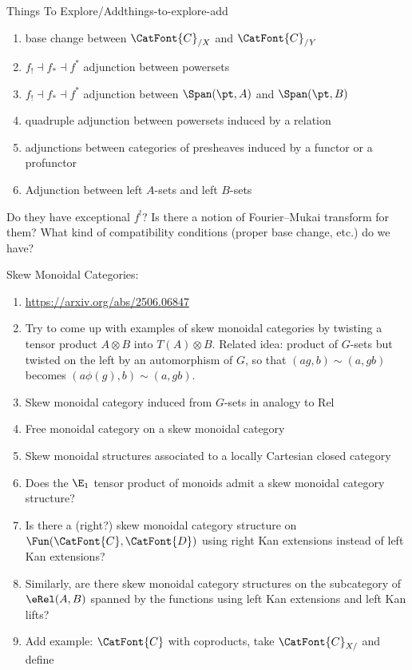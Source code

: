 \begin{remark}{Things To Explore/Add}{things-to-explore-add}
\begin{enumerate}
            \begin{enumerate}
                \item base change between $\CatFont{C}_{/X}$ and $\CatFont{C}_{/Y}$
                \item $f_{!}\dashv f_{*}\dashv f^{*}$ adjunction between powersets
                \item $f_{!}\dashv f_{*}\dashv f^{*}$ adjunction between $\Span(\pt,A)$ and $\Span(\pt,B)$
                \item quadruple adjunction between powersets induced by a relation
                \item adjunctions between categories of presheaves induced by a functor or a profunctor
                \item Adjunction between left $A$-sets and left $B$-sets
            \end{enumerate}
            Do they have exceptional $f^{!}$? Is there a notion of Fourier--Mukai transform for them? What kind of compatibility conditions (proper base change, etc.) do we have?
    \end{enumerate}
    Skew Monoidal Categories:
    \begin{enumerate}
        \item \url{https://arxiv.org/abs/2506.06847}
        \item Try to come up with examples of skew monoidal categories by twisting a tensor product $A\otimes B$ into $T(A)\otimes B$. Related idea: product of $G$-sets but twisted on the left by an automorphism of $G$, so that $(ag,b)\sim(a,gb)$ becomes $(a\phi(g),b)\sim(a,gb)$.
        \item Skew monoidal category induced from $G$-sets in analogy to Rel
        \item Free monoidal category on a skew monoidal category
        \item Skew monoidal structures associated to a locally Cartesian closed category
        \item Does the $\E_{1}$ tensor product of monoids admit a skew monoidal category structure?
        \item Is there a (right?) skew monoidal category structure on $\Fun(\CatFont{C},\CatFont{D})$ using right Kan extensions instead of left Kan extensions?
        \item Similarly, are there skew monoidal category structures on the subcategory of $\eRel(A,B)$ spanned by the functions using left Kan extensions and left Kan lifts?
        \item Add example: $\CatFont{C}$ with coproducts, take $\CatFont{C}_{X/}$ and define

\end{enumerate}
\end{remark}
